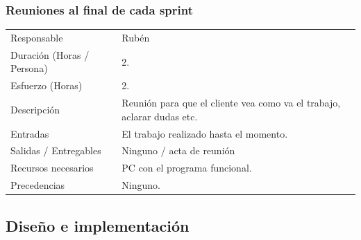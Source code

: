 \subsubsection{Reuniones al final de cada sprint}
\begin{table}[H]
    \begin{center}
        \begin{tabular}{l p{8cm}}
            Responsable                           & Rub\'{e}n \\
            Duraci\'{o}n (Horas / Persona)        & 2. \\ 
            Esfuerzo (Horas)                      & 2. \\
            Descripci\'{o}n                       & Reuni\'{o}n para que el cliente vea como va el trabajo,
                                                    aclarar dudas etc. \\
            Entradas                              & El trabajo realizado hasta el momento.\\
            Salidas / Entregables                 & Ninguno / acta de reuni\'{o}n \\
            Recursos necesarios                   & PC con el programa funcional. \\
            Precedencias                          & Ninguno. \\
        \end{tabular}
    \end{center}
    
\end{table}

\subsection{Dise\~{n}o e implementaci\'{o}n}
